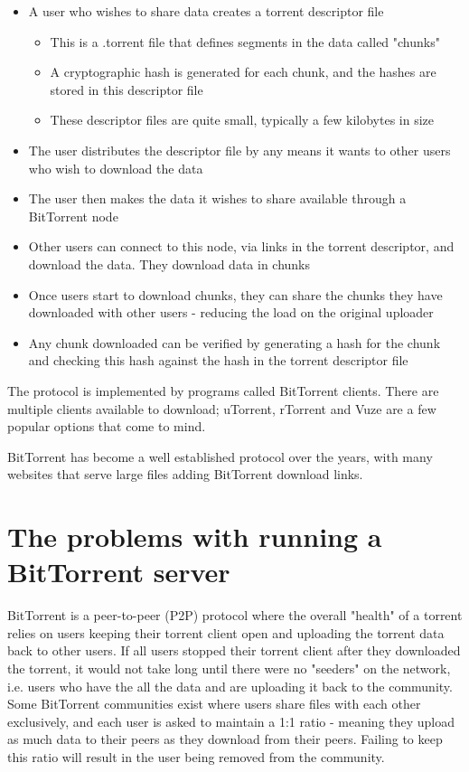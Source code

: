 \begin{itemize}
	\item A user who wishes to share data creates a torrent descriptor file
	\begin{itemize}	
		\item This is a .torrent file that defines segments in the data called "chunks"
		\item A cryptographic hash is generated for each chunk, and the hashes are stored in this descriptor file
		\item These descriptor files are quite small, typically a few kilobytes in size
	\end{itemize}  
	\item The user distributes the descriptor file by any means it wants to other users who wish to download the data
	\item The user then makes the data it wishes to share available through a BitTorrent node
	\item Other users can connect to this node, via links in the torrent descriptor, and download the data. They download data in chunks 
	\item Once users start to download chunks, they can share the chunks they have downloaded with other users - reducing the load on the original uploader
	\item Any chunk downloaded can be verified by generating a hash for the chunk and checking this hash against the hash in the torrent descriptor file
\end{itemize}

The protocol is implemented by programs called BitTorrent clients. There are multiple clients available to download; uTorrent, rTorrent and Vuze are a few popular options that come to mind.

BitTorrent has become a well established protocol over the years, with many websites that serve large files adding BitTorrent download links.


\section{The problems with running a BitTorrent server}
BitTorrent is a peer-to-peer (P2P) protocol where the overall "health" of a torrent relies on users keeping their torrent client open and uploading the torrent data back to other users. If all users stopped their torrent client after they downloaded the torrent, it would not take long until there were no "seeders" on the network, i.e. users who have the all the data and are uploading it back to the community. Some BitTorrent communities exist where users share files with each other exclusively, and each user is asked to maintain a 1:1 ratio - meaning they upload as much data to their peers as they download from their peers. Failing to keep this ratio will result in the user being removed from the community. 


